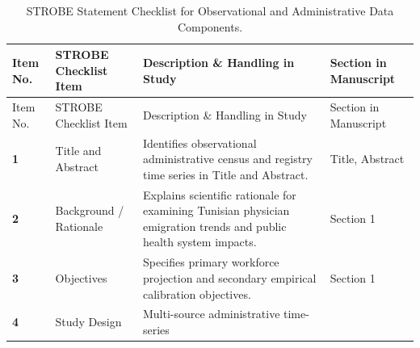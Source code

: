 \documentclass[
  11pt,
  a4paper]{article}
\begin{document}
\begin{longtable}[]{@{}
  >{\centering\arraybackslash}p{}
  >{\raggedright\arraybackslash}p{}
  >{\raggedright\arraybackslash}p{}
  >{\raggedright\arraybackslash}p{}@{}}
\caption{STROBE Statement Checklist for Observational and Administrative
Data Components.}\label{tbl-app-strobe}\tabularnewline
\toprule\noalign{}
\begin{minipage}[b]{\linewidth}\centering
Item No.
\end{minipage} & \begin{minipage}[b]{\linewidth}\raggedright
STROBE Checklist Item
\end{minipage} & \begin{minipage}[b]{\linewidth}\raggedright
Description \& Handling in Study
\end{minipage} & \begin{minipage}[b]{\linewidth}\raggedright
Section in Manuscript
\end{minipage} \\
\midrule\noalign{}
\endfirsthead
\toprule\noalign{}
\begin{minipage}[b]{\linewidth}\centering
Item No.
\end{minipage} & \begin{minipage}[b]{\linewidth}\raggedright
STROBE Checklist Item
\end{minipage} & \begin{minipage}[b]{\linewidth}\raggedright
Description \& Handling in Study
\end{minipage} & \begin{minipage}[b]{\linewidth}\raggedright
Section in Manuscript
\end{minipage} \\
\midrule\noalign{}
\endhead
\bottomrule\noalign{}
\endlastfoot
\textbf{1} & Title and Abstract & Identifies observational
administrative census and registry time series in Title and Abstract. &
Title, Abstract \\
\textbf{2} & Background / Rationale & Explains scientific rationale for
examining Tunisian physician emigration trends and public health system
impacts. & Section 1 \\
\textbf{3} & Objectives & Specifies primary workforce projection and
secondary empirical calibration objectives. & Section 1 \\
\textbf{4} & Study Design & Multi-source administrative time-series

\end{longtable}
\end{document}
